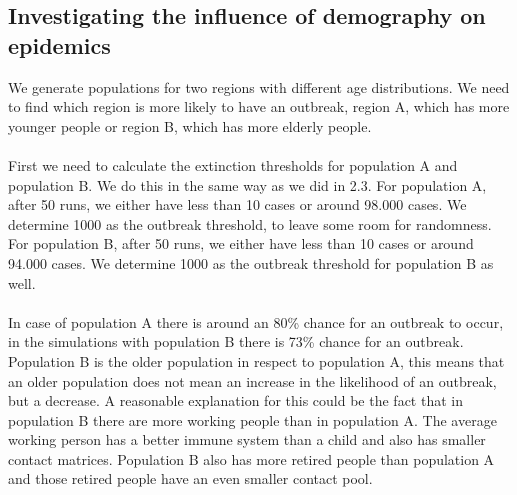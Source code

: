 \documentclass[runningheads]{llncs}
\begin{document}
	\subsection{Investigating the influence of demography on epidemics}
	We generate populations for two regions with different age distributions. We need to find which region is more likely to have an outbreak, region A, which has more younger people or region B, which has more elderly people.	
	\\
	\\	
	\noindent
	First we need to calculate the extinction thresholds for population A and population B. We do this in the same way as we did in 2.3. For population A, after 50 runs, we either have less than 10 cases or around 98.000 cases. We determine 1000 as the outbreak threshold, to leave some room for randomness. For population B, after 50 runs, we either have less than 10 cases or around 94.000 cases. We determine 1000 as the outbreak threshold for population B as well.
	\\
	\\
	\noindent
	In case of population A there is around an 80\% chance for an outbreak to occur, in the simulations with population B there is 73\% chance for an outbreak. Population B is the older population in respect to population A, this means that an older population does not mean an increase in the likelihood of an outbreak, but a decrease. A reasonable explanation for this could be the fact that in population B there are more working people than in population A. The average working person has a better immune system than a child and also has smaller contact matrices. Population B also has more retired people than population A and those retired people have an even smaller contact pool.
	
\end{document}
